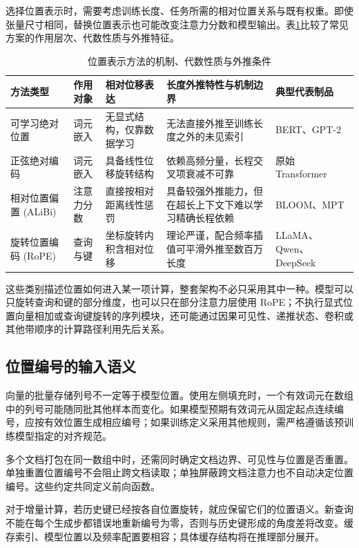 \documentclass[../textbook.tex]{subfiles}
\begin{document}
选择位置表示时，需要考虑训练长度、任务所需的相对位置关系与既有权重。即使张量尺寸相同，替换位置表示也可能改变注意力分数和模型输出。表\ref{tab:pos-comparison}比较了常见方案的作用层次、代数性质与外推特征。

\begin{table}[htbp]
\centering
\caption{位置表示方法的机制、代数性质与外推条件}\label{tab:pos-comparison}
\begin{tabularx}{\linewidth}{p{18mm}p{15mm}p{22mm}Xp{20mm}}
\toprule
方法类型 & 作用对象 & 相对位移表达 & 长度外推特性与机制边界 & 典型代表制品 \\\midrule
可学习绝对位置 & 词元嵌入 & 无显式结构，仅靠数据学习 & 无法直接外推至训练长度之外的未见索引 & BERT、GPT-2 \\
正弦绝对编码 & 词元嵌入 & 具备线性位移旋转结构 & 依赖高频分量，长程交叉项衰减不可靠 & 原始 Transformer \\
相对位置偏置 (ALiBi) & 注意力分数 & 直接按相对距离线性惩罚 & 具备较强外推能力，但在超长上下文下难以学习精确长程依赖 & BLOOM、MPT \\
旋转位置编码 (RoPE) & 查询与键 & 坐标旋转内积含相对位移 & 理论严谨，配合频率插值可平滑外推至数百万长度 & LLaMA、Qwen、DeepSeek \\
\bottomrule
\end{tabularx}
\end{table}

这些类别描述位置如何进入某一项计算，整套架构不必只采用其中一种。模型可以只旋转查询和键的部分维度，也可以只在部分注意力层使用 RoPE；不执行显式位置向量相加或查询键旋转的序列模块，还可能通过因果可见性、递推状态、卷积或其他带顺序的计算路径利用先后关系。

\subsection{位置编号的输入语义}
向量的批量存储列号不一定等于模型位置。使用左侧填充时，一个有效词元在数组中的列号可能随同批其他样本而变化。如果模型预期有效词元从固定起点连续编号，应按有效位置生成相应编号；如果训练定义采用其他规则，需严格遵循该预训练模型指定的对齐规范。

多个文档打包在同一数组中时，还需同时确定文档边界、可见性与位置是否重置。单独重置位置编号不会阻止跨文档读取；单独屏蔽跨文档注意力也不自动决定位置编号。这些约定共同定义前向函数。

对于增量计算，若历史键已经按各自位置旋转，就应保留它们的位置语义。新查询不能在每个生成步都错误地重新编号为零，否则与历史键形成的角度差将改变。缓存索引、模型位置以及频率配置要相容；具体缓存结构将在推理部分展开。
\end{document}
